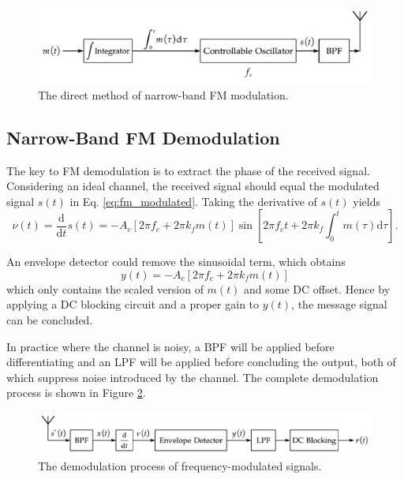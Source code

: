 \documentclass[../ECE459FinalProjectReport.tex]{subfiles}
\begin{document}
\begin{figure}[tb]
    \centering
    \includegraphics[scale=0.6]{plots/fm_mod.pdf}
    \caption{The direct method of narrow-band FM modulation.}
    \label{fig:fm-mod}
\end{figure}


\subsection{Narrow-Band FM Demodulation}
The key to FM demodulation is to extract the phase of the received signal. Considering an ideal channel, the received signal should equal the modulated signal $s(t)$ in Eq. \eqref{eq:fm_modulated}. Taking the derivative of $s(t)$ yields
\begin{equation}
    \nu \left( t \right) =\frac{\mathrm{d}}{\mathrm{d}t}s\left( t \right) =-A_c\left[ 2\pi f_c+2\pi k_fm\left( t \right) \right] \sin \left[ 2\pi f_ct+2\pi k_f\int_0^t{m\left( \tau \right) \mathrm{d}\tau} \right].
\end{equation}

An envelope detector could remove the sinusoidal term, which obtains
\begin{equation}
    y\left( t \right) = -A_c\left[ 2\pi f_c+2\pi k_fm\left( t \right) \right]
\end{equation}
which only contains the scaled version of $m(t)$ and some DC offset. Hence by applying a DC blocking circuit and a proper gain to $y(t)$, the message signal can be concluded.

In practice where the channel is noisy, a BPF will be applied before differentiating and an LPF will be applied before concluding the output, both of which suppress noise introduced by the channel. The complete demodulation process is shown in Figure \ref{fig:fm-demod}.
\begin{figure}[tb]
    \centering
    \includegraphics[scale=0.7]{plots/fm_demod.pdf}
    \caption{The demodulation process of frequency-modulated signals.}
    \label{fig:fm-demod}
\end{figure}
\end{document}

